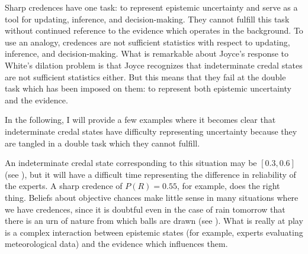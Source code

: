 \documentclass[11pt]{article}
\begin{document}
Sharp credences have one task: to represent epistemic uncertainty and
serve as a tool for updating, inference, and decision-making. They
cannot fulfill this task without continued reference to the evidence
which operates in the background. To use an analogy, credences are not
sufficient statistics with respect to updating, inference, and
decision-making. What is remarkable about Joyce's response to White's
dilation problem is that Joyce recognizes that indeterminate credal
states are not sufficient statistics either. But this means that they
fail at the double task which has been imposed on them: to represent
both epistemic uncertainty and the evidence.

In the following, I will provide a few examples where it becomes clear
that indeterminate credal states have difficulty representing
uncertainty because they are tangled in a double task which they
cannot fulfill.


An indeterminate credal state corresponding to this situation may be
$[0.3,0.6]$ (see ), but it will have a
difficult time representing the difference in reliability of the
experts. A sharp credence of $P(R)=0.55$, for example, does the right
thing. Beliefs about objective chances make little sense in many
situations where we have credences, since it is doubtful even in the
case of rain tomorrow that there is an urn of nature from which balls
are drawn (see ). What is really at play is a
complex interaction between epistemic states (for example, experts
evaluating meteorological data) and the evidence which influences
them.

\end{document}
